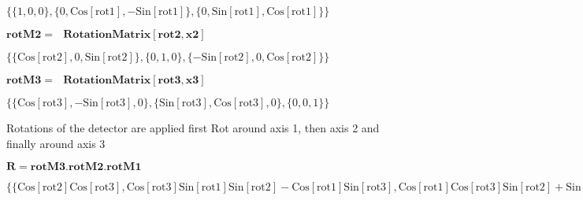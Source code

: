 \documentclass{article}
\begin{document}
\begin{doublespace}
\noindent\(\{\{1,0,0\},\{0,\text{Cos}[\text{rot1}],-\text{Sin}[\text{rot1}]\},\{0,\text{Sin}[\text{rot1}],\text{Cos}[\text{rot1}]\}\}\)
\end{doublespace}

\begin{doublespace}
\noindent\(\pmb{\text{rotM2} =\text{  }\text{RotationMatrix}[\text{rot2},\text{x2}]}\)
\end{doublespace}

\begin{doublespace}
\noindent\(\{\{\text{Cos}[\text{rot2}],0,\text{Sin}[\text{rot2}]\},\{0,1,0\},\{-\text{Sin}[\text{rot2}],0,\text{Cos}[\text{rot2}]\}\}\)
\end{doublespace}

\begin{doublespace}
\noindent\(\pmb{\text{rotM3} =\text{  }\text{RotationMatrix}[\text{rot3},\text{x3}]}\)
\end{doublespace}

\begin{doublespace}
\noindent\(\{\{\text{Cos}[\text{rot3}],-\text{Sin}[\text{rot3}],0\},\{\text{Sin}[\text{rot3}],\text{Cos}[\text{rot3}],0\},\{0,0,1\}\}\)
\end{doublespace}

Rotations of the detector are applied first Rot around axis 1, then axis 2 and finally around axis 3

\begin{doublespace}
\noindent\(\pmb{R=\text{rotM3}.\text{rotM2}.\text{rotM1}}\)
\end{doublespace}

\begin{doublespace}
\noindent\(\{\{\text{Cos}[\text{rot2}] \text{Cos}[\text{rot3}],\text{Cos}[\text{rot3}] \text{Sin}[\text{rot1}] \text{Sin}[\text{rot2}]-\text{Cos}[\text{rot1}]
\text{Sin}[\text{rot3}],\text{Cos}[\text{rot1}] \text{Cos}[\text{rot3}] \text{Sin}[\text{rot2}]+\text{Sin}[\text{rot1}] \text{Sin}[\text{rot3}]\},\{\text{Cos}[\text{rot2}]
\text{Sin}[\text{rot3}],\text{Cos}[\text{rot1}] \text{Cos}[\text{rot3}]+\text{Sin}[\text{rot1}] \text{Sin}[\text{rot2}] \text{Sin}[\text{rot3}],-\text{Cos}[\text{rot3}]
\text{Sin}[\text{rot1}]+\text{Cos}[\text{rot1}] \text{Sin}[\text{rot2}] \text{Sin}[\text{rot3}]\},\{-\text{Sin}[\text{rot2}],\text{Cos}[\text{rot2}]
\text{Sin}[\text{rot1}],\text{Cos}[\text{rot1}] \text{Cos}[\text{rot2}]\}\}\)
\end{doublespace}
\end{document}
